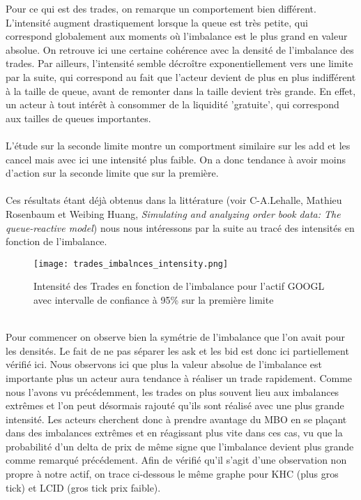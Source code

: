 \documentclass[12pt,a4paper]{article}
\theoremstyle{definition}
\theoremstyle{remark}
\begin{document}
Pour ce qui est des trades, on remarque un comportement bien différent. L'intensité augment drastiquement lorsque la queue est très petite, qui correspond globalement aux moments où l'imbalance est le plus grand en valeur absolue. On retrouve ici une certaine cohérence avec la densité de l'imbalance des trades. Par ailleurs, l'intensité semble décroître exponentiellement vers une limite par la suite, qui correspond au fait que l'acteur devient de plus en plus indifférent à la taille de queue, avant de remonter dans la taille devient très grande. En effet, un acteur à tout intérêt à consommer de la liquidité 'gratuite', qui correspond aux tailles de queues importantes. 
\\
\\
L'étude sur la seconde limite montre un comportment similaire sur les add et les cancel mais avec ici une intensité plus faible. On a donc tendance à avoir moins d'action sur la seconde limite que sur la première.
\\
\\
Ces résultats étant déjà obtenus dans la littérature (voir C-A.Lehalle, Mathieu Rosenbaum et Weibing Huang, \textit{Simulating and analyzing order book data:
The queue-reactive model}) nous nous intéressons par la suite au tracé des intensités en fonction de l'imbalance. 
\begin{figure}[h!]
    \centering
    \texttt{[image: trades\_imbalnces\_intensity.png]}
    \caption{Intensité des Trades en fonction de l'imbalance pour l'actif GOOGL avec intervalle de confiance à 95\% sur la première limite}
    \label{fig:trades}
\end{figure}
\\
Pour commencer on observe bien la symétrie de l'imbalance que l'on avait pour les densités. Le fait de ne pas séparer les ask et les bid est donc ici partiellement vérifié ici. Nous observons ici que plus la valeur absolue de l'imbalance est importante plus un acteur aura tendance à réaliser un trade rapidement.  Comme nous l'avons vu précédemment, les trades on plus souvent lieu aux imbalances extrêmes et l'on peut désormais rajouté qu'ils sont réalisé avec une plus grande intensité. Les acteurs cherchent donc à prendre avantage du MBO en se plaçant dans des imbalances extrêmes et en réagissant plus vite dans ces cas, vu que la probabilité d'un delta de prix de même signe que l'imbalance devient plus grande comme remarqué précédement. Afin de vérifié qu'il s'agit d'une observation non propre à notre actif, on trace ci-dessous le même graphe pour KHC (plus gros tick) et LCID (gros tick prix faible).
\end{document}
